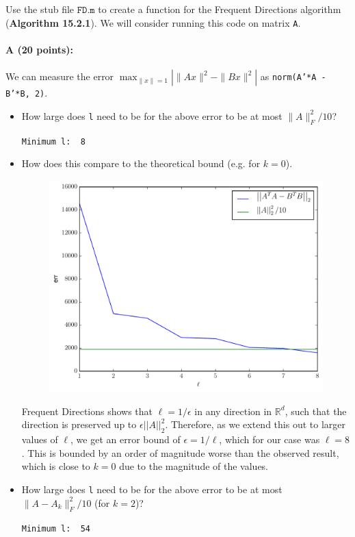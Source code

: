 \documentclass[11pt]{article}
\newcommand{\norm}[1]{\left|\left| #1 \right|\right|}
\begin{document}
Use the stub file $\texttt{FD.m}$ to create a function for the Frequent Directions algorithm (\textbf{Algorithm 15.2.1}).  We will consider running this code on matrix \texttt{A}.  

\paragraph{A (20 points):}
We can measure the error $\max_{\|x\|=1} | \|A x\|^2 - \|B x\|^2 |$ as 
\texttt{norm(A'*A - B'*B, 2)}.  
\begin{itemize} \denselist
\item How large does \texttt{l} need to be for the above error to be at most $\|A\|_F^2 /10$?  

\verb~Minimum l:  8~

\item How does this compare to the theoretical bound (e.g. for $k=0$).

\begin{figure}[H]
\centering
\includegraphics[width=.75\textwidth]{prob2a.pdf}
\end{figure}

Frequent Directions shows that $\ell = 1/\epsilon$ in any direction in $\mathbb{R}^{d}$, such that the direction is preserved up to $\epsilon \norm{A}^{2}_{2}$. Therefore, as we extend this out to larger values of $\ell$, we get an error bound of $\epsilon = 1/\ell$, which for our case was $\ell = 8$. This is bounded by an order of magnitude worse than the observed result, which is close to $k = 0$ due to the magnitude of the values.
  
\item How large does \texttt{l} need to be for the above error to be at most $\|A - A_k\|_F^2/10$ (for $k=2$)?

\verb~Minimum l:  54~

\end{itemize}
\end{document}
